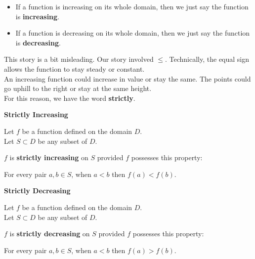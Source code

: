 \documentclass{ximera}
\begin{document}
\begin{remark}
  \begin{itemize}
    \item If a function is increasing on its whole domain, then we just say the function is \textbf{increasing}.
    \item If a function is decreasing on its whole domain, then we just say the function is \textbf{decreasing}.
  \end{itemize}
\end{remark}




This story is a bit misleading.  Our story involved $\leq$.  Technically, the equal sign allows the function to stay steady or constant. \\

An increasing function could increase in value or stay the same.  The points could go uphill to the right or stay at the same height. \\

For this reason, we have the word \textbf{strictly}.








\begin{definition} \textbf{\textcolor{green!50!black}{Strictly Increasing}} 


Let $f$ be a function defined on the domain $D$. \\
Let $S \subset D$ be any subset of $D$.

$f$ is \textbf{strictly increasing} on $S$ provided $f$ possesses this property:  


\begin{center}
For every pair $a, b \in S$, when $a < b$ then $f(a) < f(b)$.
\end{center}

\end{definition}








\begin{definition} \textbf{\textcolor{green!50!black}{Strictly Decreasing}} 


Let $f$ be a function defined on the domain $D$. \\
Let $S \subset D$ be any subset of $D$.

$f$ is \textbf{strictly decreasing} on $S$ provided $f$ possesses this property:  


\begin{center}
For every pair $a, b \in S$, when $a < b$ then $f(a) > f(b)$.
\end{center}

\end{definition}
\end{document}
